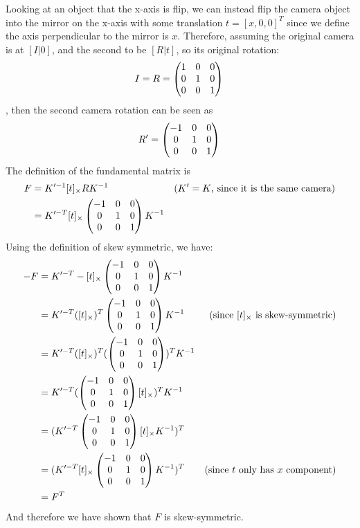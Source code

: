 \documentclass[12pt,letterpaper,boxed]{hmcpset}
\begin{document}
\begin{solution}
Looking at an object that the x-axis is flip, we can instead flip the camera object into the mirror on the x-axis with some 
translation $t= [x, 0, 0]^T$ since we define the axis perpendicular to the mirror is $x$.
Therefore, assuming the original camera is at $[I|0]$, and the second to be $[R|t]$, so its original rotation:
\[
 I = R = \begin{pmatrix}
   1 & 0 & 0\cr
   0 & 1 & 0\cr
   0 & 0 & 1\cr
  \end{pmatrix} \\
\]
 , then the second camera rotation can be seen as
 \[
 R' = \begin{pmatrix}
   -1 & 0 & 0\cr
   0 & 1 & 0\cr
   0 & 0 & 1\cr
  \end{pmatrix} \\
\]
The definition of the fundamental matrix is 
\begin{align*}
  F &=  K'^{-1} [t]_\times RK^{-1} &\text{($K' = K$, since it is the same camera)}\\
    &= 
   K'^{-T}  [t]_\times
  \begin{pmatrix}
   -1 & 0 & 0\cr
   0 & 1 & 0\cr
   0 & 0 & 1\cr
  \end{pmatrix} K^{-1}\\
\end{align*}
Using the definition of skew symmetric, we have:
\begin{align*}
  -F &= K'^{-T}  -[t]_\times
  \begin{pmatrix}
   -1 & 0 & 0\cr
   0 & 1 & 0\cr
   0 & 0 & 1\cr
  \end{pmatrix} K^{-1}\\
     &= 
  K'^{-T}  ([t]_\times)^T
  \begin{pmatrix}
   -1 & 0 & 0\cr
   0 & 1 & 0\cr
   0 & 0 & 1\cr
  \end{pmatrix} K^{-1} &\text{(since $[t]_\times$ is skew-symmetric)}\\
     &= 
  K'^{-T}  ([t]_\times)^T
  (\begin{pmatrix}
   -1 & 0 & 0\cr
   0 & 1 & 0\cr
   0 & 0 & 1\cr
  \end{pmatrix})^T K^{-1}\\
    &= 
  K'^{-T}(
  \begin{pmatrix}
   -1 & 0 & 0\cr
   0 & 1 & 0\cr
   0 & 0 & 1\cr
  \end{pmatrix}[t]_\times)^T K^{-1}\\
   &= 
  (K'^{-T}
  \begin{pmatrix}
   -1 & 0 & 0\cr
   0 & 1 & 0\cr
   0 & 0 & 1\cr
  \end{pmatrix}[t]_\times K^{-1})^T\\
     &= 
  (K'^{-T}[t]_\times
  \begin{pmatrix}
   -1 & 0 & 0\cr
   0 & 1 & 0\cr
   0 & 0 & 1\cr
  \end{pmatrix} K^{-1})^T &\text{(since $t$ only has $x$ component)}\\
  &= F^T
\end{align*}
And therefore we have shown that $F$ is skew-symmetric.
\end{solution}
\end{document}
